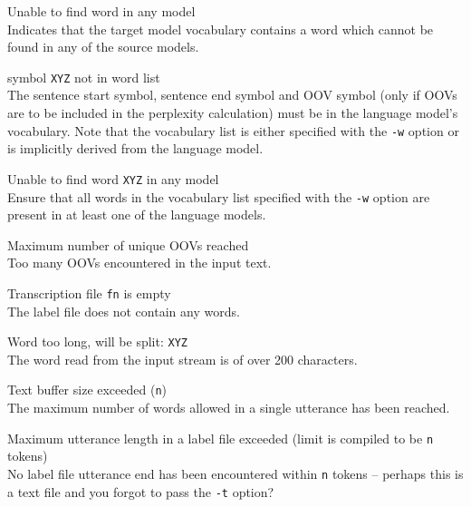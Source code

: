 \begin{itemize}

\begin{itemize}
   Unable to find word in any model\\
        Indicates that the target model vocabulary contains a word which cannot
        be found in any of the source models.
\end{itemize}




\begin{itemize}
 symbol {\tt XYZ} not in word list\\
        The sentence start symbol, sentence end symbol and OOV symbol (only if
        OOVs are to be included in the perplexity calculation) must be in the
        language model's vocabulary. Note that the vocabulary list is either 
        specified with the {\tt -w} option or is implicitly derived from the 
        language model.

 Unable to find word {\tt XYZ} in any model\\
        Ensure that all words in the vocabulary list specified with the {\tt -w}
        option are present in at least one of the language models.

 Maximum number of unique OOVs reached\\
        Too many OOVs encountered in the input text.

 Transcription file {\tt fn} is empty\\
        The label file does not contain any words.

 Word too long, will be split: {\tt XYZ}\\
        The word read from the input stream is of over 200 characters.

 Text buffer size exceeded ({\tt n})\\ 
        The maximum number of words allowed in a single utterance has been 
        reached.

 Maximum utterance length in a label file exceeded (limit
        is compiled to be {\tt n} tokens)\\
        No label file utterance end has been encountered within
        {\tt n} tokens -- perhaps this is a text file and you forgot
        to pass the {\tt -t} option?
\end{itemize}




\end{itemize}
